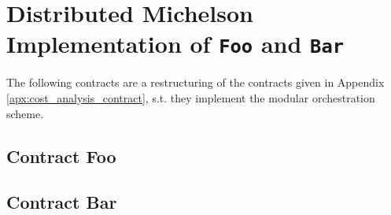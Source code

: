 \chapter{Distributed Michelson Implementation of \texttt{Foo} and \texttt{Bar}}\label{apx:foobar_distributed}
The following contracts are a restructuring of the contracts given in Appendix \ref{apx:cost_analysis_contract}, s.t. they implement the modular orchestration scheme.

\section{Contract Foo}




\section{Contract Bar}


